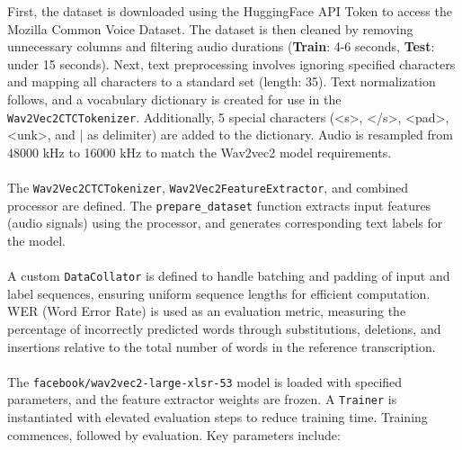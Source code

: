 \documentclass{article}
\begin{document}
First, the dataset is downloaded using the HuggingFace API Token to access the Mozilla Common Voice Dataset. The dataset is then cleaned by removing unnecessary columns and filtering audio durations (\textbf{Train}: 4-6 seconds, \textbf{Test}: under 15 seconds). Next, text preprocessing involves ignoring specified characters and mapping all characters to a standard set (length: 35). Text normalization follows, and a vocabulary dictionary is created for use in the \texttt{Wav2Vec2CTCTokenizer}. Additionally, 5 special characters (\textless s\textgreater, \textless/s\textgreater, \textless pad\textgreater, \textless unk\textgreater, and | as delimiter) are added to the dictionary. Audio is resampled from 48000 kHz to 16000 kHz to match the Wav2vec2 model requirements.\\\\
The \texttt{Wav2Vec2CTCTokenizer}, \texttt{Wav2Vec2FeatureExtractor}, and combined processor are defined. The \texttt{prepare\_dataset} function extracts input features (audio signals) using the processor, and generates corresponding text labels for the model.\\\\
A custom \texttt{DataCollator} is defined to handle batching and padding of input and label sequences, ensuring uniform sequence lengths for efficient computation. WER (Word Error Rate) is used as an evaluation metric, measuring the percentage of incorrectly predicted words through substitutions, deletions, and insertions relative to the total number of words in the reference transcription.\\\\
The \texttt{facebook/wav2vec2-large-xlsr-53} model is loaded with specified parameters, and the feature extractor weights are frozen. A \texttt{Trainer} is instantiated with elevated evaluation steps to reduce training time. Training commences, followed by evaluation. Key parameters include:
\end{document}
